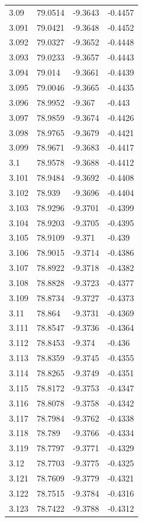 \begin{tabular}{llll}
3.09 & 79.0514 & -9.3643 & -0.4457 \\
3.091 & 79.0421 & -9.3648 & -0.4452 \\
3.092 & 79.0327 & -9.3652 & -0.4448 \\
3.093 & 79.0233 & -9.3657 & -0.4443 \\
3.094 & 79.014 & -9.3661 & -0.4439 \\
3.095 & 79.0046 & -9.3665 & -0.4435 \\
3.096 & 78.9952 & -9.367 & -0.443 \\
3.097 & 78.9859 & -9.3674 & -0.4426 \\
3.098 & 78.9765 & -9.3679 & -0.4421 \\
3.099 & 78.9671 & -9.3683 & -0.4417 \\
3.1 & 78.9578 & -9.3688 & -0.4412 \\
3.101 & 78.9484 & -9.3692 & -0.4408 \\
3.102 & 78.939 & -9.3696 & -0.4404 \\
3.103 & 78.9296 & -9.3701 & -0.4399 \\
3.104 & 78.9203 & -9.3705 & -0.4395 \\
3.105 & 78.9109 & -9.371 & -0.439 \\
3.106 & 78.9015 & -9.3714 & -0.4386 \\
3.107 & 78.8922 & -9.3718 & -0.4382 \\
3.108 & 78.8828 & -9.3723 & -0.4377 \\
3.109 & 78.8734 & -9.3727 & -0.4373 \\
3.11 & 78.864 & -9.3731 & -0.4369 \\
3.111 & 78.8547 & -9.3736 & -0.4364 \\
3.112 & 78.8453 & -9.374 & -0.436 \\
3.113 & 78.8359 & -9.3745 & -0.4355 \\
3.114 & 78.8265 & -9.3749 & -0.4351 \\
3.115 & 78.8172 & -9.3753 & -0.4347 \\
3.116 & 78.8078 & -9.3758 & -0.4342 \\
3.117 & 78.7984 & -9.3762 & -0.4338 \\
3.118 & 78.789 & -9.3766 & -0.4334 \\
3.119 & 78.7797 & -9.3771 & -0.4329 \\
3.12 & 78.7703 & -9.3775 & -0.4325 \\
3.121 & 78.7609 & -9.3779 & -0.4321 \\
3.122 & 78.7515 & -9.3784 & -0.4316 \\
3.123 & 78.7422 & -9.3788 & -0.4312 \\

\end{tabular}
